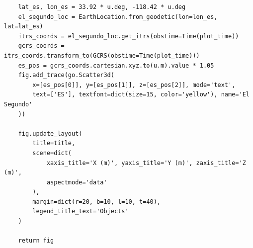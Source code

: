 \documentclass[11pt]{article}
\begin{document}
\begin{Verbatim}
    lat_es, lon_es = 33.92 * u.deg, -118.42 * u.deg
    el_segundo_loc = EarthLocation.from_geodetic(lon=lon_es, lat=lat_es)
    itrs_coords = el_segundo_loc.get_itrs(obstime=Time(plot_time))
    gcrs_coords = itrs_coords.transform_to(GCRS(obstime=Time(plot_time)))
    es_pos = gcrs_coords.cartesian.xyz.to(u.m).value * 1.05
    fig.add_trace(go.Scatter3d(
        x=[es_pos[0]], y=[es_pos[1]], z=[es_pos[2]], mode='text',
        text=['ES'], textfont=dict(size=15, color='yellow'), name='El Segundo'
    ))

    fig.update_layout(
        title=title,
        scene=dict(
            xaxis_title='X (m)', yaxis_title='Y (m)', zaxis_title='Z (m)',
            aspectmode='data'
        ),
        margin=dict(r=20, b=10, l=10, t=40),
        legend_title_text='Objects'
    )

    return fig
\end{Verbatim}
\end{document}
